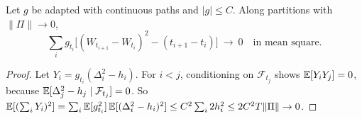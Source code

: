 \begin{chapterrefs}
\begin{lemma}\label{lem3:qvweighted}
Let $g$ be adapted with continuous paths and $|g|\le C$. Along partitions with $\lVert\Pi\rVert\to0$,
\begin{equation*}
  \sum_i g_{t_i}\bigl[(W_{t_{i+1}}-W_{t_i})^2-(t_{i+1}-t_i)\bigr]\ \longrightarrow\ 0
  \quad\text{in mean square.}
\end{equation*}
\end{lemma}

\begin{proof}
Let $Y_i=g_{t_i}(\Delta_i^2-h_i)$. For $i<j$, conditioning on $\mathcal F_{t_j}$ shows $\mathbb{E}[Y_iY_j]=0$,
because $\mathbb{E}[\Delta_j^2-h_j\mid\mathcal F_{t_j}]=0$. So
$\mathbb{E}[(\sum_iY_i)^2]=\sum_i\mathbb{E}[g_{t_i}^2]\,\mathbb{E}[(\Delta_i^2-h_i)^2]\le C^2\sum_i2h_i^2\le2C^2T\lVert\Pi\rVert\to0$.
\end{proof}


\end{chapterrefs}
